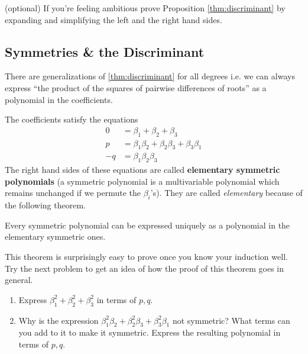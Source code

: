 \begin{questions}[resume]
  \item (optional) If you're feeling ambitious prove Proposition \ref{thm:discriminant} by expanding and simplifying the left and the right hand sides.
\end{questions}






\newpage
\subsection{Symmetries \& the Discriminant}

There are generalizations of \ref{thm:discriminant} for all degrees i.e. we can always express ``the product of the squares of pairwise differences of roots'' as a polynomial in the coefficients. 

The coefficients satisfy the equations 
\begin{align*}
	0  & = \beta_1 + \beta_2 + \beta_3                    \\
	p  & = \beta_1 \beta_2 + \beta_2 \beta_3 + \beta_3\beta_1 \\
	-q & = \beta_1 \beta_2 \beta_3                        
\end{align*}  
The right hand sides of these equations are called \textbf{elementary symmetric polynomials} (a symmetric polynomial is a multivariable polynomial which remains unchanged if we permute the $\beta_i$'s). They are called \emph{elementary} because of the following theorem.

\begin{thm}
	Every symmetric polynomial can be expressed uniquely as a polynomial in the elementary symmetric ones.
\end{thm}

This theorem is surprisingly easy to prove once you know your induction well. Try the next problem to get an idea of how the proof of this theorem goes in general.
\begin{questions}[resume]
	\item 
	\begin{enumerate}
		\item Express $ \beta_1^2 + \beta_2^2 + \beta_3^2$ in terms of $ p,q$. 
		
		\item Why is the expression $ \beta_1^2 \beta_2 + \beta_2^2 \beta_3  + \beta_3^2 \beta_1 $ not symmetric? What terms can you add to it to make it symmetric. Express the resulting polynomial in terms of $ p,q$. 
	\end{enumerate}
\end{questions}


